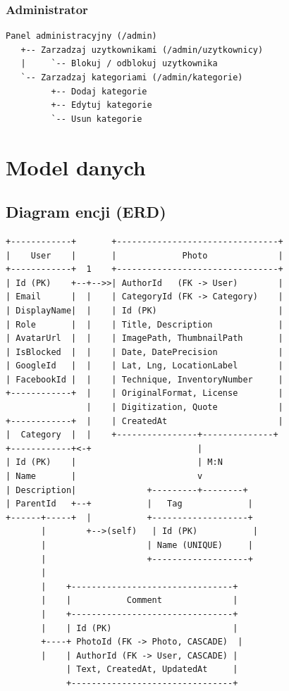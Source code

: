 \documentclass[12pt, a4paper]{article}
\begin{document}
\subsubsection{Administrator}

\begin{lstlisting}[style=plain]
Panel administracyjny (/admin)
   +-- Zarzadzaj uzytkownikami (/admin/uzytkownicy)
   |     `-- Blokuj / odblokuj uzytkownika
   `-- Zarzadzaj kategoriami (/admin/kategorie)
         +-- Dodaj kategorie
         +-- Edytuj kategorie
         `-- Usun kategorie
\end{lstlisting}

\section{Model danych}

\subsection{Diagram encji (ERD)}

\begin{lstlisting}[style=plain, caption={Uproszczony diagram encji}]
+------------+       +--------------------------------+
|    User    |       |             Photo              |
+------------+  1    +--------------------------------+
| Id (PK)    +--+-->>| AuthorId   (FK -> User)        |
| Email      |  |    | CategoryId (FK -> Category)    |
| DisplayName|  |    | Id (PK)                        |
| Role       |  |    | Title, Description             |
| AvatarUrl  |  |    | ImagePath, ThumbnailPath       |
| IsBlocked  |  |    | Date, DatePrecision            |
| GoogleId   |  |    | Lat, Lng, LocationLabel        |
| FacebookId |  |    | Technique, InventoryNumber     |
+------------+  |    | OriginalFormat, License        |
                |    | Digitization, Quote            |
+------------+  |    | CreatedAt                      |
|  Category  |  |    +----------------+--------------+
+------------+<-+                     |
| Id (PK)    |                        | M:N
| Name       |                        v
| Description|              +---------+--------+
| ParentId   +--+           |   Tag             |
+------+-----+  |           +-------------------+
       |        +-->(self)   | Id (PK)           |
       |                    | Name (UNIQUE)     |
       |                    +-------------------+
       |
       |    +--------------------------------+
       |    |           Comment              |
       |    +--------------------------------+
       |    | Id (PK)                        |
       +----+ PhotoId (FK -> Photo, CASCADE)  |
       |    | AuthorId (FK -> User, CASCADE) |
            | Text, CreatedAt, UpdatedAt     |
            +--------------------------------+
\end{lstlisting}
\end{document}
